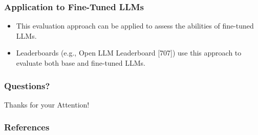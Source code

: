 \documentclass[handout]{beamer}
\begin{document}
\begin{frame}[t]
  \frametitle{Application to Fine-Tuned LLMs}
  \begin{itemize}
    \item This evaluation approach can be applied to assess the abilities of fine-tuned LLMs.
    \item Leaderboards (e.g., Open LLM Leaderboard [707]) use this approach to evaluate both base and fine-tuned LLMs.
  \end{itemize}
\end{frame}


\begin{frame}
\frametitle{Questions?}
\begin{center}\LARGE Thanks for your Attention!\\ \end{center}



\end{frame}

\begin{frame}[allowframebreaks]\scriptsize
\frametitle{References}


%
\end{frame}  


\end{document}
